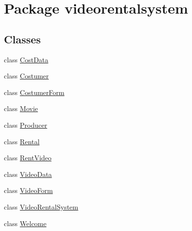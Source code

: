 \hypertarget{namespacevideorentalsystem}{\section{Package videorentalsystem}
\label{namespacevideorentalsystem}
}
\subsection*{Classes}
\begin{DoxyCompactItemize}
\item 
class \hyperlink{classvideorentalsystem_1_1CostData}{Cost\-Data}
\item 
class \hyperlink{classvideorentalsystem_1_1Costumer}{Costumer}
\item 
class \hyperlink{classvideorentalsystem_1_1CostumerForm}{Costumer\-Form}
\item 
class \hyperlink{classvideorentalsystem_1_1Movie}{Movie}
\item 
class \hyperlink{classvideorentalsystem_1_1Producer}{Producer}
\item 
class \hyperlink{classvideorentalsystem_1_1Rental}{Rental}
\item 
class \hyperlink{classvideorentalsystem_1_1RentVideo}{Rent\-Video}
\item 
class \hyperlink{classvideorentalsystem_1_1VideoData}{Video\-Data}
\item 
class \hyperlink{classvideorentalsystem_1_1VideoForm}{Video\-Form}
\item 
class \hyperlink{classvideorentalsystem_1_1VideoRentalSystem}{Video\-Rental\-System}
\item 
class \hyperlink{classvideorentalsystem_1_1Welcome}{Welcome}
\end{DoxyCompactItemize}

